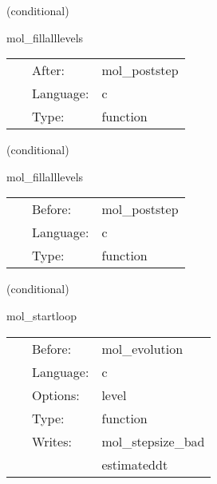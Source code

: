 \vspace{5mm}

   (conditional) 

\hspace{5mm} mol\_fillalllevels 

\hspace{5mm}{\it a bad routine. fills all previous timelevels with data copied from the current. } 


\hspace{5mm}

 \begin{tabular*}{160mm}{cll} 
~ & After:  & mol\_poststep \\ 
~ & Language:  & c \\ 
~ & Type:  & function \\ 
\end{tabular*} 


\vspace{5mm}

   (conditional) 

\hspace{5mm} mol\_fillalllevels 

\hspace{5mm}{\it a bad routine. fills all previous timelevels with data copied from the current. } 


\hspace{5mm}

 \begin{tabular*}{160mm}{cll} 
~ & Before:  & mol\_poststep \\ 
~ & Language:  & c \\ 
~ & Type:  & function \\ 
\end{tabular*} 


\vspace{5mm}

   (conditional) 

\hspace{5mm} mol\_startloop 

\hspace{5mm}{\it initialise the step size control } 


\hspace{5mm}

 \begin{tabular*}{160mm}{cll} 
~ & Before:  & mol\_evolution \\ 
~ & Language:  & c \\ 
~ & Options:  & level \\ 
~ & Type:  & function \\ 
~ & Writes:  & mol\_stepsize\_bad \\ 
~& ~ &estimateddt\\ 
\end{tabular*} 


